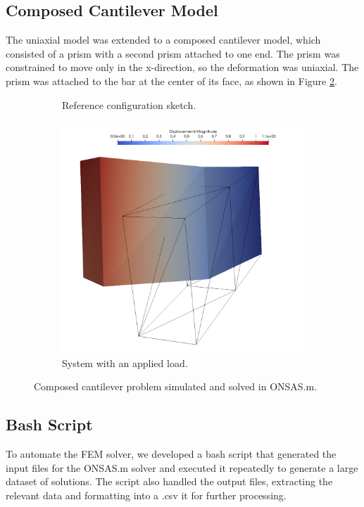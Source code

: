 \documentclass[11pt]{scrartcl} %
\begin{document}
\subsection{Composed Cantilever Model}
The uniaxial model was extended to a composed cantilever model, which consisted of a prism with a second prism attached to one end. The prism was constrained to move only in the x-direction, so the deformation was uniaxial. The prism was attached to the bar at the center of its face, as shown in Figure \ref{fig:composed_cantilever_model}.
\begin{figure}[h]
	\centering
	\begin{subfigure}[b]{0.48\textwidth}
	\def\svgwidth{\textwidth}
	
	\caption{Reference configuration sketch.}
	\label{fig:ex1_ilus}
	\end{subfigure}
	\hfill
	\begin{subfigure}[b]{0.48\textwidth}
	\centering
	\includegraphics[width=\textwidth]{Figures/Ejemplo2.png}
	\caption{System with an applied load.}
	\end{subfigure}
	\caption{Composed cantilever problem simulated and solved in ONSAS.m.}
	\label{fig:composed_cantilever_model}
\end{figure}


\subsection{Bash Script}
To automate the FEM solver, we developed a bash script that generated the input files for the ONSAS.m solver and executed it repeatedly to generate a large dataset of solutions. The script also handled the output files, extracting the relevant data and formatting into a .csv it for further processing.
\end{document}
